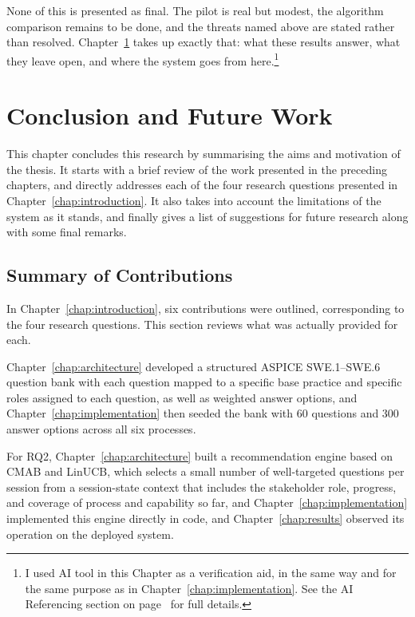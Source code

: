 \documentclass[a4paper, 12pt, oneside, openany, BCOR1cm,toc=chapterentrywithdots]{scrbook}
\begin{document}
None of this is presented as final. The pilot is real but modest, the algorithm comparison
remains to be done, and the threats named above are stated rather than resolved.
Chapter~\ref{chap:conclusion} takes up exactly that: what these results answer, what they leave
open, and where the system goes from here.\footnote{I used AI tool in this Chapter as a
verification aid, in the same way and for the same purpose as in Chapter~\ref{chap:implementation}.
See the AI Referencing section on page~\pageref{app:ai-referencing} for full details.}

\chapter{Conclusion and Future Work}
\label{chap:conclusion}
% 

This chapter concludes this research by summarising the aims and motivation of the thesis. It
starts with a brief review of the work presented in the preceding chapters, and directly
addresses each of the four research questions presented in Chapter~\ref{chap:introduction}. It
also takes into account the limitations of the system as it stands, and finally gives a list of
suggestions for future research along with some final remarks.

\section{Summary of Contributions}

In Chapter~\ref{chap:introduction}, six contributions were outlined, corresponding to the four
research questions. This section reviews what was actually provided for each.

Chapter~\ref{chap:architecture} developed a structured ASPICE SWE.1--SWE.6 question bank with
each question mapped to a specific base practice and specific roles assigned to each question,
as well as weighted answer options, and Chapter~\ref{chap:implementation} then seeded the bank
with 60 questions and 300 answer options across all six processes.

For RQ2, Chapter~\ref{chap:architecture} built a recommendation engine based on CMAB and LinUCB,
which selects a small number of well-targeted questions per session from a session-state context
that includes the stakeholder role, progress, and coverage of process and capability so far, and
Chapter~\ref{chap:implementation} implemented this engine directly in code, and
Chapter~\ref{chap:results} observed its operation on the deployed system.
\end{document}

